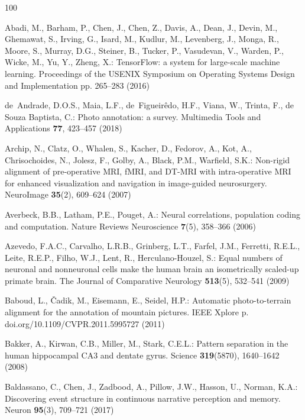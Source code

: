 \documentclass[runningheads]{llncs}
\begin{document}
\begin{thebibliography}{100}
\providecommand{\url}[1]{\texttt{#1}}
\providecommand{\urlprefix}{URL }
\providecommand{\doi}[1]{https://doi.org/#1}

Abadi, M., Barham, P., Chen, J., Chen, Z., Davis, A., Dean, J., Devin, M.,
  Ghemawat, S., Irving, G., Isard, M., Kudlur, M., Levenberg, J., Monga, R.,
  Moore, S., Murray, D.G., Steiner, B., Tucker, P., Vasudevan, V., Warden, P.,
  Wicke, M., Yu, Y., Zheng, X.: {TensorFlow}: a system for large-scale machine
  learning. Proceedings of the {USENIX} Symposium on Operating Systems Design
  and Implementation pp. 265--283 (2016)

de~Andrade, D.O.S., Maia, L.F., de~Figueir{\^e}do, H.F., Viana, W., Trinta, F.,
  {de Souza Baptista}, C.: Photo annotation: a survey. Multimedia Tools and
  Applications  \textbf{77},  423--457 (2018)

Archip, N., Clatz, O., Whalen, S., Kacher, D., Fedorov, A., Kot, A.,
  Chrisochoides, N., Jolesz, F., Golby, A., Black, P.M., Warfield, S.K.:
  Non-rigid alignment of pre-operative {MRI}, {fMRI}, and {DT-MRI} with
  intra-operative {MRI} for enhanced visualization and navigation in
  image-guided neurosurgery. {NeuroImage}  \textbf{35}(2),  609--624 (2007)

Averbeck, B.B., Latham, P.E., Pouget, A.: Neural correlations, population
  coding and computation. Nature Reviews Neuroscience  \textbf{7}(5),  358--366
  (2006)

Azevedo, F.A.C., Carvalho, L.R.B., Grinberg, L.T., Farfel, J.M., Ferretti,
  R.E.L., Leite, R.E.P., Filho, W.J., Lent, R., Herculano-Houzel, S.: Equal
  numbers of neuronal and nonneuronal cells make the human brain an
  isometrically scaled-up primate brain. The Journal of Comparative Neurology
  \textbf{513}(5),  532--541 (2009)

Baboud, L., {\v C}adik, M., Eisemann, E., Seidel, H.P.: Automatic
  photo-to-terrain alignment for the annotation of mountain pictures. {IEEE}
  {Xplore} p. doi.org/10.1109/CVPR.2011.5995727 (2011)

Bakker, A., Kirwan, C.B., Miller, M., Stark, C.E.L.: Pattern separation in the
  human hippocampal {CA3} and dentate gyrus. Science  \textbf{319}(5870),
  1640--1642 (2008)

Baldassano, C., Chen, J., Zadbood, A., Pillow, J.W., Hasson, U., Norman, K.A.:
  Discovering event structure in continuous narrative perception and memory.
  Neuron  \textbf{95}(3),  709--721 (2017)


\end{thebibliography}
\end{document}
